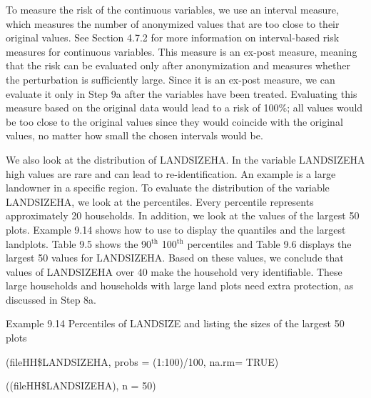 \documentclass[letterpaper,10pt,english]{sphinxmanual}
\begin{document}

To measure the risk of the continuous variables, we use an interval
measure, which measures the number of anonymized values that are too
close to their original values. See Section 4.7.2 for more information
on interval-based risk measures for continuous variables. This measure
is an ex-post measure, meaning that the risk can be evaluated only after
anonymization and measures whether the perturbation is sufficiently
large. Since it is an ex-post measure, we can evaluate it only in Step
9a after the variables have been treated. Evaluating this measure based
on the original data would lead to a risk of 100\%; all values would be
too close to the original values since they would coincide with the
original values, no matter how small the chosen intervals would be.

We also look at the distribution of LANDSIZEHA. In the variable
LANDSIZEHA high values are rare and can lead to re-identification. An
example is a large landowner in a specific region. To evaluate the
distribution of the variable LANDSIZEHA, we look at the percentiles.
Every percentile represents approximately 20 households. In addition, we
look at the values of the largest 50 plots. Example 9.14 shows how to
use  to display the quantiles and the largest landplots. Table 9.5
shows the 90$^{\text{th}}$ \textendash{} 100$^{\text{th}}$ percentiles and Table 9.6
displays the largest 50 values for LANDSIZEHA. Based on these values, we
conclude that values of LANDSIZEHA over 40 make the household very
identifiable. These large households and households with large land
plots need extra protection, as discussed in Step 8a.

Example 9.14 Percentiles of LANDSIZE and listing the sizes of the
largest 50 plots

\begin{DUlineblock}{0em}
\item[] 
\item[] (fileHH\$LANDSIZEHA, probs = (1:100)/100, na.rm= TRUE)
\end{DUlineblock}

\begin{DUlineblock}{0em}
\item[] 
\item[] ((fileHH\$LANDSIZEHA), n = 50)
\end{DUlineblock}
\end{document}

